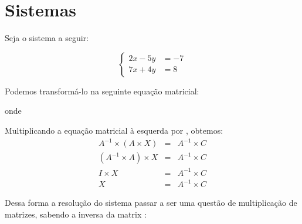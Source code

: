 \documentclass[twocolumn,oneside,a4paper,12pt]{article}
\begin{document}
\maketitle

\section*{Sistemas }

Seja o sistema a seguir:

\begin{equation*}
  \left\{ \begin{aligned}
      2x - 5y & = -7 \\
      7x + 4y & = 8 
  \end{aligned} \right.
\end{equation*}

\noindent Podemos transformá-lo na seguinte equação matricial:


\noindent onde 


Multiplicando a equação matricial  à esquerda por , obtemos:
\begin{eqnarray*}
A^{-1} \times (A \times X) & = & A^{-1} \times C \\
(A^{-1} \times A) \times X & = & A^{-1} \times C \\
I \times X & = & A^{-1} \times C \\
X & = & A^{-1} \times C
\end{eqnarray*}

\noindent Dessa forma a resolução do sistema passar a ser uma questão de multiplicação de matrizes, sabendo a inversa da matrix :

\end{document}
